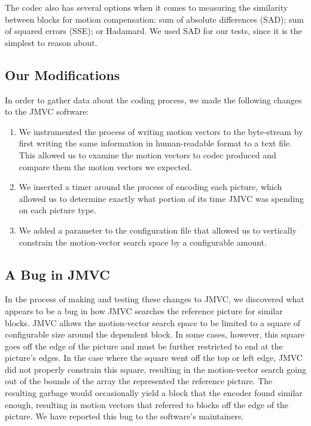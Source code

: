 \documentclass[twoside, 11pt]{article}
\begin{document}
The codec also has several options when it comes to measuring the similarity
between blocks for motion compensation: sum of absolute differences (SAD); sum
of squared errors (SSE); or Hadamard. We used SAD for our tests, since it is
the simplest to reason about.

\subsection{Our Modifications}
\label{subsec:modifications}
In order to gather data about the coding process, we made the following changes
to the JMVC software:

\begin{enumerate}
\item We instrumented the process of writing motion vectors to the byte-stream
by first writing the same information in human-readable format to a text file.
This allowed us to examine the motion vectors to codec produced and compare them
the motion vectors we expected.

\item We inserted a timer around the process of encoding each picture, which
allowed us to determine exactly what portion of its time JMVC was spending on
each picture type.

\item We added a parameter to the configuration file that allowed us to
vertically constrain the motion-vector search space by a configurable amount.
\end{enumerate}

\subsection{A Bug in JMVC}
\label{subsec:bug}
In the process of making and testing these changes to JMVC, we discovered what
appears to be a bug in how JMVC searches the reference picture for similar
blocks. JMVC allows the motion-vector search space to be limited to a square of
configurable size around the dependent block. In some cases, however, this
square goes off the edge of the picture and must be further restricted to end
at the picture's edges. In the case where the square went off the top or left
edge, JMVC did not properly constrain this square, resulting in the
motion-vector search going out of the bounds of the array the represented the
reference picture. The resulting garbage would occasionally yield a block that
the encoder found similar enough, resulting in motion vectors that referred to
blocks off the edge of the picture. We have reported this bug to the software's
maintainers.
\end{document}
